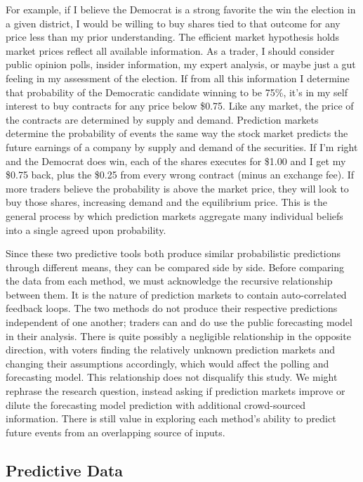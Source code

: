 \documentclass[11pt,]{article}
\begin{document}
For example, if I believe the Democrat is a strong favorite the win the
election in a given district, I would be willing to buy shares tied to
that outcome for any price less than my prior understanding. The
efficient market hypothesis holds market prices reflect all available
information. As a trader, I should consider public opinion polls,
insider information, my expert analysis, or maybe just a gut feeling in
my assessment of the election. If from all this information I determine
that probability of the Democratic candidate winning to be 75\%, it's in
my self interest to buy contracts for any price below \$0.75. Like any
market, the price of the contracts are determined by supply and demand.
Prediction markets determine the probability of events the same way the
stock market predicts the future earnings of a company by supply and
demand of the securities. If I'm right and the Democrat does win, each
of the shares executes for \$1.00 and I get my \$0.75 back, plus the
\$0.25 from every wrong contract (minus an exchange fee). If more
traders believe the probability is above the market price, they will
look to buy those shares, increasing demand and the equilibrium price.
This is the general process by which prediction markets aggregate many
individual beliefs into a single agreed upon probability.

Since these two predictive tools both produce similar probabilistic
predictions through different means, they can be compared side by side.
Before comparing the data from each method, we must acknowledge the
recursive relationship between them. It is the nature of prediction
markets to contain auto-correlated feedback loops. The two methods do
not produce their respective predictions independent of one another;
traders can and do use the public forecasting model in their analysis.
There is quite possibly a negligible relationship in the opposite
direction, with voters finding the relatively unknown prediction markets
and changing their assumptions accordingly, which would affect the
polling and forecasting model. This relationship does not disqualify
this study. We might rephrase the research question, instead asking if
prediction markets improve or dilute the forecasting model prediction
with additional crowd-sourced information. There is still value in
exploring each method's ability to predict future events from an
overlapping source of inputs.

\hypertarget{predictive-data}{%
\subsection{Predictive Data}\label{predictive-data}}
\end{document}
